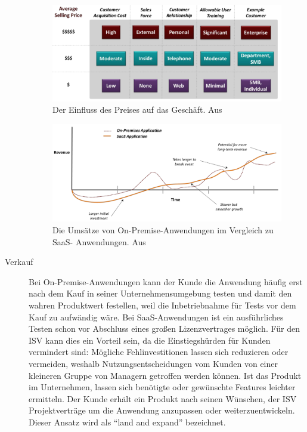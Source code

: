 \begin{description}
\begin{figure}%
\begin{center}
\includegraphics[width=\textwidth]{images/einfluss_des_preises_auf_business.png}
\caption{Der Einfluss des Preises auf das Geschäft. Aus 
\protect{} }
\label{fig:einfluss_des_preises_auf_business}
\end{center}
\end{figure}

\begin{figure}%
\begin{center}
\includegraphics[width=\textwidth]{images/vergleich_umsatz_on-premise_cloud.png}
\caption{Die Umsätze von On-Premise-Anwendungen im Vergleich zu SaaS-
Anwendungen. Aus 
\protect{} }
\label{fig:vergleich_umsatz_on-premise_cloud}
\end{center}
\end{figure}

	\item[Verkauf] Bei On-Premise-Anwendungen kann der Kunde die Anwendung 
häufig erst nach dem Kauf in seiner Unternehmensumgebung testen und damit den 
wahren Produktwert festellen, weil die Inbetriebnahme für Tests vor dem Kauf zu 
aufwändig wäre. Bei SaaS-Anwendungen ist ein ausführliches Testen schon vor 
Abschluss eines großen Lizenzvertrages möglich. Für den ISV kann dies ein 
Vorteil sein, da die Einstiegshürden für Kunden vermindert sind: Mögliche 
Fehlinvestitionen lassen sich reduzieren oder vermeiden, weshalb 
Nutzungsentscheidungen vom Kunden von einer kleineren Gruppe von Managern 
getroffen werden können. Ist das Produkt im Unternehmen, lassen sich benötigte 
oder gewünschte Features leichter ermitteln. Der Kunde erhält ein Produkt nach 
seinen Wünschen, der ISV Projektverträge um die Anwendung anzupassen oder 
weiterzuentwickeln. Dieser Ansatz wird als "`land and expand"' bezeichnet.

\end{description}

